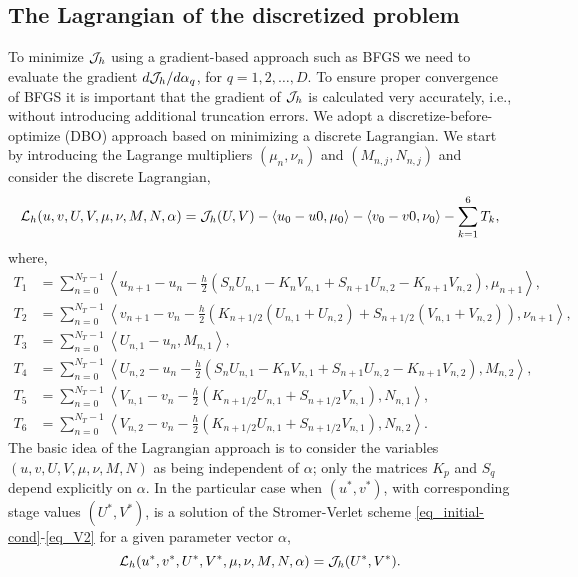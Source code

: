 \documentclass[11pt]{article}
\begin{document}
\subsection{The Lagrangian of the discretized problem}
To minimize ${\cal J}_h$ using a gradient-based approach such as BFGS we need to evaluate the gradient
$d {\cal J}_h/ d\alpha_q$, for $q=1,2,\ldots,D$. To ensure proper convergence of BFGS it is important that the
gradient of ${\cal J}_h$ is calculated very accurately, i.e., without introducing additional truncation errors. We
adopt a discretize-before-optimize (DBO) approach based on minimizing a discrete Lagrangian. We start by
introducing the Lagrange multipliers $(\mu_n,\nu_n)$ and $(M_{n,j}, N_{n,j})$ and consider the discrete Lagrangian,
\begin{equation}
{\cal L}_h(u,v,U,V, \mu,\nu,M,N,\alpha) = {\cal J}_h(U,V) - \langle u_0 - u0, \mu_0\rangle - \langle
v_0 - v0, \nu_0\rangle - \sum_{k=1}^6 T_k,
\end{equation}
where,
\begin{align}
T_1 &= \sum_{n=0}^{N_T-1} \left\langle u_{n+1} - u_n - \frac{h}{2}\left(S_nU_{n,1} - K_nV_{n,1} + S_{n+1}U_{n,2} - K_{n+1}V_{n,2}
  \right), \mu_{n+1} \right\rangle,\\
T_2 &= \sum_{n=0}^{N_T-1} \left\langle v_{n+1} - v_n - \frac{h}{2}\left(K_{n+1/2} \left(U_{n,1} + U_{n,2}\right) + S_{n+1/2}\left(
  V_{n,1} +  V_{n,2}\right) \right), \nu_{n+1} \right\rangle,\\
T_3 &= \sum_{n=0}^{N_T-1} \left\langle U_{n,1} - u_n, M_{n,1} \right\rangle,\\
T_4 &= \sum_{n=0}^{N_T-1} \left\langle U_{n,2} - u_n - \frac{h}{2}\left(S_nU_{n,1} - K_nV_{n,1} + S_{n+1}U_{n,2} -
  K_{n+1}V_{n,2} \right), M_{n,2} \right\rangle,\\
T_5 &= \sum_{n=0}^{N_T-1} \left\langle V_{n,1} - v_n - \frac{h}{2}\left(  K_{n+1/2} U_{n,1} + S_{n+1/2} V_{n,1} \right), N_{n,1} \right\rangle,\\
T_6 &= \sum_{n=0}^{N_T-1} \left\langle V_{n,2} - v_n - \frac{h}{2}\left(  K_{n+1/2} U_{n,1} + S_{n+1/2} V_{n,1} \right), N_{n,2} \right\rangle.
\end{align}
The basic idea of the Lagrangian approach is to consider the variables $(u,v,U,V, \mu,\nu,M,N)$ as being independent of
$\alpha$; only the matrices $K_p$ and $S_q$ depend explicitly on $\alpha$. In the particular case
when $(u^*,v^*)$, with
corresponding stage values $(U^*,V^*)$, is a solution of the Stromer-Verlet scheme
\eqref{eq_initial-cond}-\eqref{eq_V2} for a given parameter vector $\alpha$,
\[
  {\cal L}_h(u^*,v^*,U^*,V^*, \mu,\nu,M,N,\alpha) = {\cal J}_h(U^*,V^*).
\]



\end{document}
